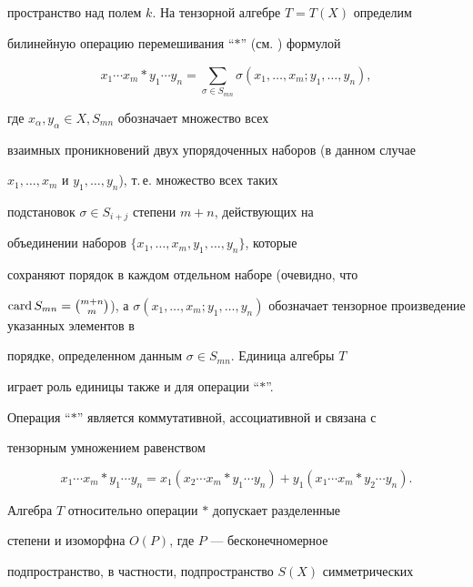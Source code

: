 пространство над полем $k$. На тензорной алгебре $T=T(X)$ определим


билинейную операцию перемешивания ``$*$'' (см. \cite{Ree}) формулой


$$


x_1\dotsb x_m * y_1\dotsb y_n=


\sum_{\sigma \in S_{mn}}^{ }\sigma (x_1,\dotsc ,x_m;y_1,\dotsc ,y_n),


$$


где $x_{\alpha }, y_{\alpha } \in X, S_{mn}$ обозначает множество всех


взаимных проникновений двух упорядоченных наборов (в данном случае


$x_1,\dotsc ,x_m$ и $y_1,\dotsc ,y_n$), т.\,е. множество всех таких


подстановок $\sigma \in S_{i+j}$ степени $m+n$, действующих на


объединении наборов $\{x_1,\dotsc ,x_m,y_1,\dotsc ,y_n\}$, которые


сохраняют порядок в каждом отдельном наборе (очевидно, что


$\card S_{mn}=\binom{m+n}{m}$), а $\sigma (x_1,\dotsc ,x_m;y_1,


\dotsc ,y_n)$ обозначает тензорное произведение указанных элементов в


порядке, определенном данным $\sigma \in S_{mn}$. Единица алгебры $T$


играет роль единицы также и для операции ``$*$''.





Операция ``$*$'' является коммутативной, ассоциативной и связана с


тензорным умножением равенством


\begin{equation}\label{1}


x_1\dotsb x_m * y_1\dotsb y_n=x_1(x_2\dotsb x_m * y_1\dotsb y_n)+


y_1(x_1\dotsb x_m * y_2\dotsb y_n).


\end{equation}





Алгебра $T$ относительно операции $*$ допускает разделенные


степени и изоморфна $O(P)$, где $P$ --- бесконечномерное


подпространство, в частности, подпространство $S(X)$ симметрических


